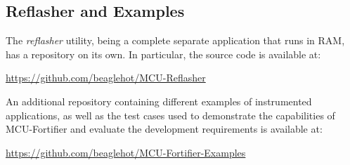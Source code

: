 \documentclass{article}
\begin{document}
\subsection{Reflasher and Examples}
The \textit{reflasher} utility, being a complete separate application that runs in RAM, has a repository on its own.
In particular, the source code is available at:

\url{https://github.com/beaglehot/MCU-Reflasher}

An additional repository containing different examples of instrumented applications, as well as the test cases used to demonstrate the capabilities of MCU-Fortifier and evaluate the development requirements is available at:

\url{https://github.com/beaglehot/MCU-Fortifier-Examples}







\clearpage

\end{document}
